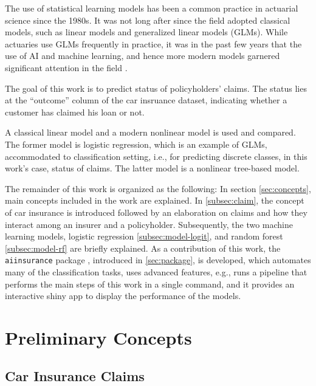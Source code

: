 \documentclass{article}
\begin{document}
The use of statistical learning models has been a common practice in
actuarial science since the 1980s. It was not long after since the field
adopted classical models, such as linear models and generalized linear
models (GLMs). While actuaries use GLMs frequently in practice, it was
in the past few years that the use of AI and machine learning, and hence
more modern models garnered significant attention in the field
\cite{rev1}.

The goal of this work is to predict status of policyholders' claims. The
status lies at the ``outcome'' column of the car insruance dataset,
indicating whether a customer has claimed his loan or not.

A classical linear model and a modern nonlinear model is used and
compared. The former model is logistic regression, which is an example
of GLMs, accommodated to classification setting, i.e., for predicting
discrete classes, in this work's case, status of claims. The latter
model is a nonlinear tree-based model.

The remainder of this work is organized as the following: In section
\ref{sec:concepts}, main concepts included in the work are explained. In
\ref{subsec:claim}, the concept of car insurance is introduced followed
by an elaboration on claims and how they interact among an insurer and a
policyholder. Subsequently, the two machine learning models, logistic
regression \ref{subsec:model-logit}, and random forest
\ref{subsec:model-rf} are briefly explained. As a contribution of this
work, the \texttt{aiinsurance} package \cite{package}, introduced in
\ref{sec:package}, is developed, which automates many of the
classification tasks, uses advanced features, e.g., runs a pipeline that
performs the main steps of this work in a single command, and it
provides an interactive shiny app to display the performance of the
models.

\newpage

\hypertarget{preliminary-concepts}{%
\section{\texorpdfstring{Preliminary Concepts
\label{sec:concepts}}{Preliminary Concepts }}\label{preliminary-concepts}}

\hypertarget{car-insurance-claims}{%
\subsection{\texorpdfstring{Car Insurance Claims
\label{subsec:claim}}{Car Insurance Claims }}\label{car-insurance-claims}}
\end{document}
